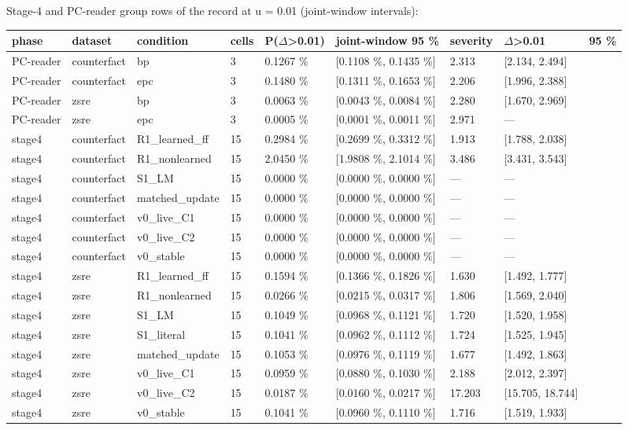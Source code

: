\documentclass[10pt,a4paper]{article}
\begin{document}
Stage-4 and PC-reader group rows of the record at u = 0.01 (joint-window intervals):



\begin{center}\scriptsize
\begin{tabularx}{\textwidth}{@{}p{}XXXXXXXX@{}}
\toprule
phase & dataset & condition & cells & P($\Delta$>0.01) & joint-window 95 \% & severity & $\Delta$>0.01 & 95 \% \\ \midrule
PC-reader & counterfact & bp & 3 & 0.1267 \% & [0.1108 \%, 0.1435 \%] & 2.313 & [2.134, 2.494] &  \\
PC-reader & counterfact & epc & 3 & 0.1480 \% & [0.1311 \%, 0.1653 \%] & 2.206 & [1.996, 2.388] &  \\
PC-reader & zsre & bp & 3 & 0.0063 \% & [0.0043 \%, 0.0084 \%] & 2.280 & [1.670, 2.969] &  \\
PC-reader & zsre & epc & 3 & 0.0005 \% & [0.0001 \%, 0.0011 \%] & 2.971 & — &  \\
stage4 & counterfact & R1\_learned\_ff & 15 & 0.2984 \% & [0.2699 \%, 0.3312 \%] & 1.913 & [1.788, 2.038] &  \\
stage4 & counterfact & R1\_nonlearned & 15 & 2.0450 \% & [1.9808 \%, 2.1014 \%] & 3.486 & [3.431, 3.543] &  \\
stage4 & counterfact & S1\_LM & 15 & 0.0000 \% & [0.0000 \%, 0.0000 \%] & — & — &  \\
stage4 & counterfact & matched\_update & 15 & 0.0000 \% & [0.0000 \%, 0.0000 \%] & — & — &  \\
stage4 & counterfact & v0\_live\_C1 & 15 & 0.0000 \% & [0.0000 \%, 0.0000 \%] & — & — &  \\
stage4 & counterfact & v0\_live\_C2 & 15 & 0.0000 \% & [0.0000 \%, 0.0000 \%] & — & — &  \\
stage4 & counterfact & v0\_stable & 15 & 0.0000 \% & [0.0000 \%, 0.0000 \%] & — & — &  \\
stage4 & zsre & R1\_learned\_ff & 15 & 0.1594 \% & [0.1366 \%, 0.1826 \%] & 1.630 & [1.492, 1.777] &  \\
stage4 & zsre & R1\_nonlearned & 15 & 0.0266 \% & [0.0215 \%, 0.0317 \%] & 1.806 & [1.569, 2.040] &  \\
stage4 & zsre & S1\_LM & 15 & 0.1049 \% & [0.0968 \%, 0.1121 \%] & 1.720 & [1.520, 1.958] &  \\
stage4 & zsre & S1\_literal & 15 & 0.1041 \% & [0.0962 \%, 0.1112 \%] & 1.724 & [1.525, 1.945] &  \\
stage4 & zsre & matched\_update & 15 & 0.1053 \% & [0.0976 \%, 0.1119 \%] & 1.677 & [1.492, 1.863] &  \\
stage4 & zsre & v0\_live\_C1 & 15 & 0.0959 \% & [0.0880 \%, 0.1030 \%] & 2.188 & [2.012, 2.397] &  \\
stage4 & zsre & v0\_live\_C2 & 15 & 0.0187 \% & [0.0160 \%, 0.0217 \%] & 17.203 & [15.705, 18.744] &  \\
stage4 & zsre & v0\_stable & 15 & 0.1041 \% & [0.0960 \%, 0.1110 \%] & 1.716 & [1.519, 1.933] &  \\
\bottomrule
\end{tabularx}
\end{center}
\end{document}
